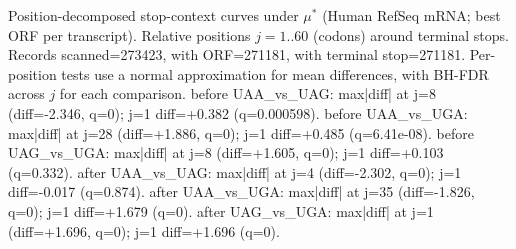 Position-decomposed stop-context curves under $\mu^\ast$ (Human RefSeq mRNA; best ORF per transcript). Relative positions $j=1..60$ (codons) around terminal stops. Records scanned=273423, with ORF=271181, with terminal stop=271181. Per-position tests use a normal approximation for mean differences, with BH-FDR across $j$ for each comparison.
before UAA\_vs\_UAG: max|diff| at j=8 (diff=-2.346, q=0); j=1 diff=+0.382 (q=0.000598). before UAA\_vs\_UGA: max|diff| at j=28 (diff=+1.886, q=0); j=1 diff=+0.485 (q=6.41e-08). before UAG\_vs\_UGA: max|diff| at j=8 (diff=+1.605, q=0); j=1 diff=+0.103 (q=0.332). after UAA\_vs\_UAG: max|diff| at j=4 (diff=-2.302, q=0); j=1 diff=-0.017 (q=0.874). after UAA\_vs\_UGA: max|diff| at j=35 (diff=-1.826, q=0); j=1 diff=+1.679 (q=0). after UAG\_vs\_UGA: max|diff| at j=1 (diff=+1.696, q=0); j=1 diff=+1.696 (q=0).
